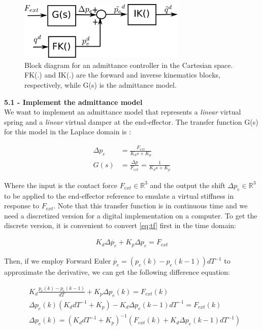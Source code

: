 \documentclass[11pt]{article}
\newcommand{\Rnum}{\mathbb{R}} %
\begin{document}
\begin{figure}[bht]
	\centering
	\includegraphics[width=8cm]{pics/admittanceControl.pdf}
	\caption{Block diagram for an admittance controller in the Cartesian space. FK(.) and IK(.) are the forward and inverse kinematics blocks, respectively, while G(s) is the admittance model.}
	\label{fig:admittance}
\end{figure}

\quad

\noindent
\textbf{5.1 - Implement the admittance model }\\
We want to implement an admittance model that represents a \textit{linear} virtual spring and a \textit{linear} virtual damper at the end-effector.
The transfer function G(s) for this model in the Laplace domain is :



\begin{align}
\label{eq:tf}
\Delta p_e &= \frac{ F_{ext} }{K_d s + K_p}\\
G(s)& = \frac{\Delta p}{F_{ext}} = \frac{ 1 }{K_d s + K_p} \nonumber
\end{align}


Where the input is the contact force $F_{ext}\in \Rnum^3$ and the output the shift  $\Delta p_e\in \Rnum^3$ to be applied to the end-effector reference to emulate a virtual stiffness in response to  $F_{ext}$. Note that this transfer function is in continuous time and we need a discretized version for a digital implementation on a computer. To get the discrete version, it is convenient to convert \eqref{eq:tf} first in the time domain:

\begin{align*}
K_d \Delta\dot{ p_e} + K_p{\Delta p_e}  =  F_{ext}  
\end{align*}
 
Then, if  we  employ Forward Euler $\dot{p_e} = (p_e(k)- p_e(k-1))dT^{-1}$ to approximate the derivative, we can get the following difference equation:

\begin{align*}
&K_d \frac{p_e(k)- p_e(k-1)}{dT}  + K_p \Delta p_e(k)  =  F_{ext}(k)  \\
&\Delta p_e(k) (K_d dT^{-1} + K_p ) - K_d \Delta p_e(k-1)dT^{-1} =  F_{ext}(k)\\
&\Delta p_e(k) =  (K_d dT^{-1} + K_p )^{-1} (F_{ext}(k) + K_d \Delta p_e(k-1)dT^{-1})
\end{align*}
\end{document}
